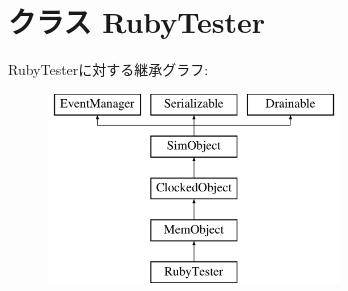 \hypertarget{classRubyTester_1_1RubyTester}{
\section{クラス RubyTester}
\label{classRubyTester_1_1RubyTester}
}
RubyTesterに対する継承グラフ:\begin{figure}[H]
\begin{center}
\leavevmode
\includegraphics[height=5cm]{classRubyTester_1_1RubyTester}
\end{center}
\end{figure}
